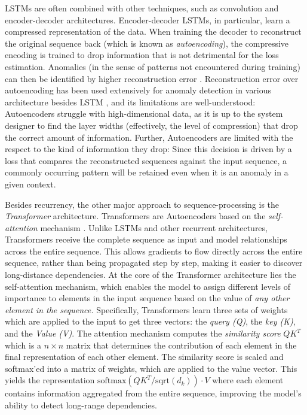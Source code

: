 \documentclass[conference]{IEEEtran}
\begin{document}
LSTMs are often combined with other techniques, such as convolution
and encoder-decoder architectures. Encoder-decoder LSTMs, in
particular, learn a compressed representation of the data. When
training the decoder to reconstruct the original sequence back
(which is known as \emph{autoencoding}), the compressive encoding is
trained to drop information that is not detrimental for the loss
estimation. Anomalies (in the sense of patterns not encountered during
training) can then be identified by higher reconstruction error
\cite{SGUEGLIA2022170,aerospace6110117}.
Reconstruction error over autoencoding has been used extensively for
anomaly detection in various architecture besides LSTM
\cite{10.1145/3691338}, and its limitations are well-understood:
Autoencoders struggle with high-dimensional data, as it is up to the
system designer to find the layer widths (effectively, the level of
compression) that drop the correct amount of information.
Further, Autoencoders are limited with the respect to the kind of
information they drop: Since this decision is driven by a loss that
compares the reconstructed sequences against the input sequence, a
commonly occurring pattern will be retained even when it is an anomaly
in a given context.

Besides recurrency, the other major approach to sequence-processing is
the \emph{Transformer} architecture. Transformers are Autoencoders
based on the \emph{self-attention} mechanism \cite{vaswani-etal:2017}.
Unlike LSTMs and other recurrent architectures, Transformers receive
the complete sequence as input and model relationships across the
entire sequence. This allows gradients to flow directly across the
entire sequence, rather than being propagated step by step, making it
easier to discover long-distance dependencies.
%
At the core of the Transformer architecture lies the self-attention
mechanism, which enables the model to assign different levels of
importance to elements in the input sequence
based on the value of \emph{any other element in the sequence.}
Specifically, Transformers learn three sets of weights which are
applied to the input to get three vectors: the \emph{query (Q)}, the
\emph{key (K)}, and the \emph{Value (V)}.
The attention mechanism computes the \emph{similarity score} $QK^T$
which is a $n\times n$ matrix that determines the contribution of each
element in the final representation of each other element. The
similarity score is scaled and softmax'ed into a matrix of weights,
which are applied to the value vector. This yields the representation
%
$\mathrm{softmax}\left(QK^T / \mathrm{sqrt}(d_k)\right)\cdot V$
%
where each element contains information aggregated from the entire
sequence, improving the model's ability to detect long-range dependencies.
\end{document}
